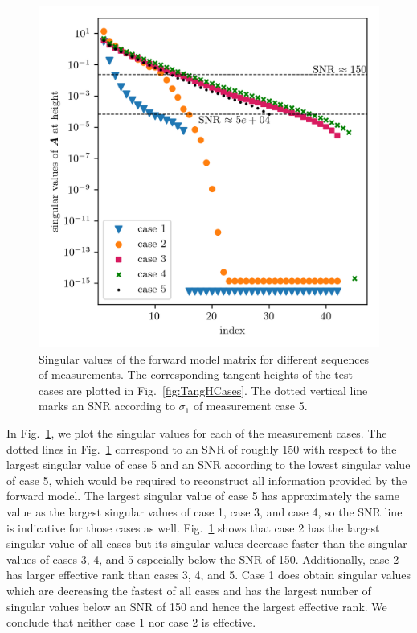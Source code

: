 \begin{figure}[ht!]
	\centering
	\includegraphics{SingValA.png}
	\caption[Singular values of linear forward model matrix for different sequences of measurements.]{Singular values of the forward model matrix for different sequences of measurements.
	The corresponding tangent heights of the test cases are plotted in Fig.~\ref{fig:TangHCases}. The dotted vertical line marks an SNR according to $\sigma_1$ of measurement case 5.}
\label{fig:SingA}
\end{figure}
In Fig.~\ref{fig:SingA}, we plot the singular values for each of the measurement cases.
The dotted lines in Fig.~\ref{fig:SingA} correspond to an SNR of roughly 150 with respect to the largest singular value of case 5 and an SNR according to the lowest singular value of case 5, which would be required to reconstruct all information provided by the forward model.
The largest singular value of case 5 has approximately the same value as the largest singular values of case 1, case 3, and case 4, so the SNR line is indicative for those cases as well.
Fig.~\ref{fig:SingA} shows that case 2 has the largest singular value of all cases but its singular values decrease faster than the singular values of cases 3, 4, and 5 especially below the SNR of 150.
Additionally, case 2 has larger effective rank than cases 3, 4, and 5.
Case 1 does obtain singular values which are decreasing the fastest of all cases and has the largest number of singular values below an SNR of 150 and hence the largest effective rank.
We conclude that neither case 1 nor case 2 is effective.

